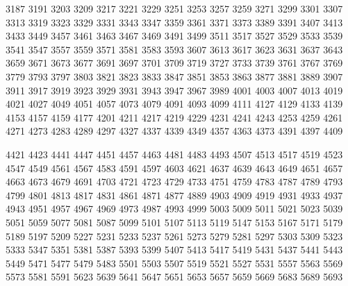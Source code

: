     \vfill
    
    3187
    3191
    3203
    3209
    3217
    3221
    3229
    3251
    3253
    3257
    3259
    3271
    3299
    3301
    3307
    3313
    3319
    3323
    3329
    3331
    3343
    3347
    3359
    3361
    3371
    3373
    3389
    3391
    3407
    3413
    3433
    3449
    3457
    3461
    3463
    3467
    3469
    3491
    3499
    3511
    3517
    3527
    3529
    3533
    3539
    3541
    3547
    3557
    3559
    3571
    3581
    3583
    3593
    3607
    3613
    3617
    3623
    3631
    3637
    3643
    3659
    3671
    3673
    3677
    3691
    3697
    3701
    3709
    3719
    3727
    3733
    3739
    3761
    3767
    3769
    3779
    3793
    3797
    3803
    3821
    3823
    3833
    3847
    3851
    3853
    3863
    3877
    3881
    3889
    3907
    3911
    3917
    3919
    3923
    3929
    3931
    3943
    3947
    3967
    3989
    4001
    4003
    4007
    4013
    4019
    4021
    4027
    4049
    4051
    4057
    4073
    4079
    4091
    4093
    4099
    4111
    4127
    4129
    4133
    4139
    4153
    4157
    4159
    4177
    4201
    4211
    4217
    4219
    4229
    4231
    4241
    4243
    4253
    4259
    4261
    4271
    4273
    4283
    4289
    4297
    4327
    4337
    4339
    4349
    4357
    4363
    4373
    4391
    4397
    4409
    
    \vfill
    
    4421
    4423
    4441
    4447
    4451
    4457
    4463
    4481
    4483
    4493
    4507
    4513
    4517
    4519
    4523
    4547
    4549
    4561
    4567
    4583
    4591
    4597
    4603
    4621
    4637
    4639
    4643
    4649
    4651
    4657
    4663
    4673
    4679
    4691
    4703
    4721
    4723
    4729
    4733
    4751
    4759
    4783
    4787
    4789
    4793
    4799
    4801
    4813
    4817
    4831
    4861
    4871
    4877
    4889
    4903
    4909
    4919
    4931
    4933
    4937
    4943
    4951
    4957
    4967
    4969
    4973
    4987
    4993
    4999
    5003
    5009
    5011
    5021
    5023
    5039
    5051
    5059
    5077
    5081
    5087
    5099
    5101
    5107
    5113
    5119
    5147
    5153
    5167
    5171
    5179
    5189
    5197
    5209
    5227
    5231
    5233
    5237
    5261
    5273
    5279
    5281
    5297
    5303
    5309
    5323
    5333
    5347
    5351
    5381
    5387
    5393
    5399
    5407
    5413
    5417
    5419
    5431
    5437
    5441
    5443
    5449
    5471
    5477
    5479
    5483
    5501
    5503
    5507
    5519
    5521
    5527
    5531
    5557
    5563
    5569
    5573
    5581
    5591
    5623
    5639
    5641
    5647
    5651
    5653
    5657
    5659
    5669
    5683
    5689
    5693
    
